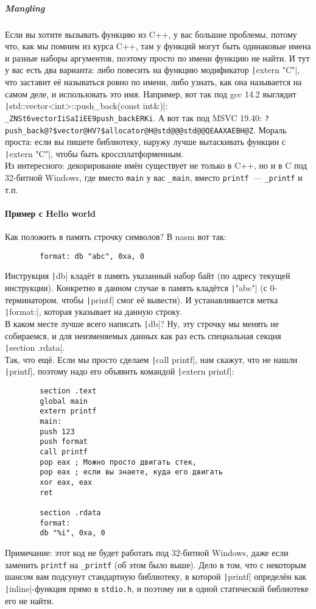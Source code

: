 \documentclass{article}
\begin{document}
    \subparagraph{Mangling}
    Если вы хотите вызывать функцию из C++, у вас большие проблемы, потому что, как мы помним из курса C++, там у функций могут быть одинаковые имена и разные наборы аргументов, поэтому просто по имени функцию не найти. И тут у вас есть два варианта: либо повесить на функцию модификатор \texttt|extern "C"|, что заставит её называться ровно по имени, либо узнать, как она называется на самом деле, и использовать это имя. Например, вот так под gcc 14.2 выглядит \texttt|std::vector<int>::push_back(const int&)|: \Verb|_ZNSt6vectorIiSaIiEE9push_backERKi|. А вот так под MSVC 19.40: \Verb|?push_back@?$vector@HV?$allocator@H@std@@@std@@QEAAXAEBH@Z|. Мораль проста: если вы пишете библиотеку, наружу лучше вытаскивать функции с \texttt|extern "C"|, чтобы быть кроссплатформенным.\\
    Из интересного: декорирование имён существует не только в C++, но и в C под 32-битной Windows, где вместо \Verb|main| у вас \Verb|_main|, вместо \Verb|printf|~--- \Verb|_printf| и т.п.
    \paragraph{Пример с Hello world}
    Как положить в память строчку символов? В nasm вот так:
    \begin{verbatim}
        format: db "abc", 0xa, 0
    \end{verbatim}
    Инструкция \texttt|db| кладёт в память указанный набор байт (по адресу текущей инструкции). Конкретно в данном случае в память кладётся \texttt|"abc\n"| (с 0-терминатором, чтобы \texttt|printf| смог её вывести). И устанавливается метка \texttt|format:|, которая указывает на данную строку.\\
    В каком месте лучше всего написать \texttt|db|? Ну, эту строчку мы менять не собираемся, и для неизменяемых данных как раз есть специальная секция \texttt|section .rdata|.\\
    Так, что ещё. Если мы просто сделаем \texttt|call printf|, нам скажут, что не нашли \texttt|printf|, поэтому надо его объявить командой \texttt|extern printf|:
    \begin{verbatim}
        section .text
        global main
        extern printf
        main:
        push 123
        push format
        call printf
        pop eax ; Можно просто двигать стек,
        pop eax ; если вы знаете, куда его двигать
        xor eax, eax
        ret
        
        section .rdata
        format:
        db "%i", 0xa, 0
    \end{verbatim}
    Примечание: этот код не будет работать под 32-битной Windows, даже если заменить \Verb|printf| на \Verb|_printf| (об этом было выше). Дело в том, что с некоторым шансом вам подсунут стандартную библиотеку, в которой \texttt|printf| определён как \texttt|inline|-функция прямо в \Verb|stdio.h|, и поэтому ни в одной статической библиотеке его не найти.
\end{document}
